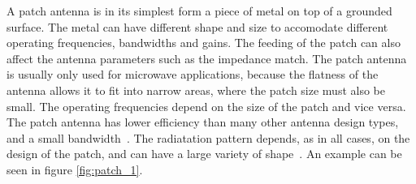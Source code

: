 A patch antenna is in its simplest form a piece of metal on top of a grounded surface. The metal can have different shape and size to accomodate different operating frequencies, bandwidths and gains. The feeding of the patch can also affect the antenna parameters such as the impedance match. The patch antenna is usually only used for microwave applications, because the flatness of the antenna allows it to fit into narrow areas, where the patch size must also be small. The operating frequencies depend on the size of the patch and vice versa. The patch antenna has lower efficiency than many other antenna design types, and a small bandwidth~\cite[p. 7.3]{ant_eng_hk}. The radiatation pattern depends, as in all cases, on the design of the patch, and can have a large variety of shape~\cite[p. 7.1-7.5]{ant_eng_hk}. An example can be seen in figure \ref{fig:patch_1}.
